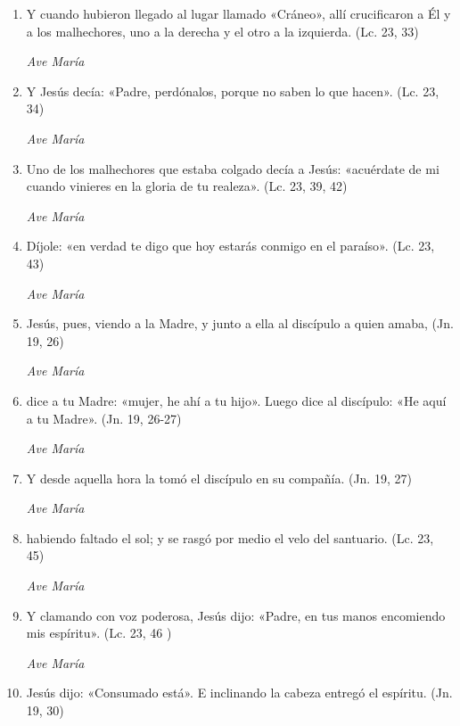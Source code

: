 \documentclass[a4paper,11pt, oneside]{report}
\begin{document}
      \begin{enumerate}
        
        \item Y cuando hubieron llegado al lugar llamado «Cráneo», allí crucificaron a Él y a los malhechores, uno a la derecha y el otro a la izquierda. (Lc. 23, 33)

        \textit{Ave María}

        \item Y Jesús decía: «Padre, perdónalos, porque no saben lo que hacen». (Lc. 23, 34)

        \textit{Ave María}

        \item Uno de los malhechores que estaba colgado decía a Jesús: «acuérdate de mi cuando vinieres en la gloria de tu realeza». (Lc. 23, 39, 42)

        \textit{Ave María}

        \item Díjole: «en verdad te digo que hoy estarás conmigo en el paraíso». (Lc. 23, 43)

        \textit{Ave María}

        \item Jesús, pues, viendo a la Madre, y junto a ella al discípulo a quien amaba, (Jn. 19, 26)

        \textit{Ave María}

        \item dice a tu Madre: «mujer, he ahí a tu hijo». Luego dice al discípulo: «He aquí a tu Madre». (Jn. 19, 26-27)

        \textit{Ave María}

        \item Y desde aquella hora la tomó el discípulo en su compañía. (Jn. 19, 27)

        \textit{Ave María}

        \item habiendo faltado el sol; y se rasgó por medio el velo del santuario. (Lc. 23, 45)

        \textit{Ave María}

        \item Y clamando con voz poderosa, Jesús dijo: «Padre, en tus manos encomiendo mis espíritu». (Lc. 23, 46 )

        \textit{Ave María}

        \item Jesús dijo: «Consumado está». E inclinando la cabeza entregó el espíritu. (Jn. 19, 30)

      \end{enumerate}
\end{document}
